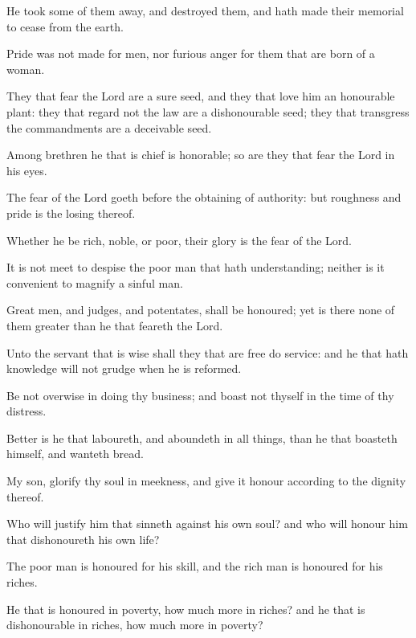 {\par }{\PP {}He took some of them away, and destroyed them, and hath made their memorial to cease from the earth.
\par }{\PP {}Pride was not made for men, nor furious anger for them that are born of a woman.
\par }{\PP {}They that fear the Lord are a sure seed, and they that love him an honourable plant: they that regard not the law are a dishonourable seed; they that transgress the commandments are a deceivable seed.
\par }{\PP {}Among brethren he that is chief is honorable; so are they that fear the Lord in his eyes.
\par }{\PP {}The fear of the Lord goeth before the obtaining of authority: but roughness and pride is the losing thereof.
\par }{\PP {}Whether he be rich, noble, or poor, their glory is the fear of the Lord.
\par }{\PP {}It is not meet to despise the poor man that hath understanding; neither is it convenient to magnify a sinful man.
\par }{\PP {}Great men, and judges, and potentates, shall be honoured; yet is there none of them greater than he that feareth the Lord.
\par }{\PP {}Unto the servant that is wise shall they that are free do service: and he that hath knowledge will not grudge when he is reformed.
\par }{\PP {}Be not overwise in doing thy business; and boast not thyself in the time of thy distress.
\par }{\PP {}Better is he that laboureth, and aboundeth in all things, than he that boasteth himself, and wanteth bread.
\par }{\PP {}My son, glorify thy soul in meekness, and give it honour according to the dignity thereof.
\par }{\PP {}Who will justify him that sinneth against his own soul? and who will honour him that dishonoureth his own life?
\par }{\PP {}The poor man is honoured for his skill, and the rich man is honoured for his riches.
\par }{\PP {}He that is honoured in poverty, how much more in riches? and he that is dishonourable in riches, how much more in poverty?

}
